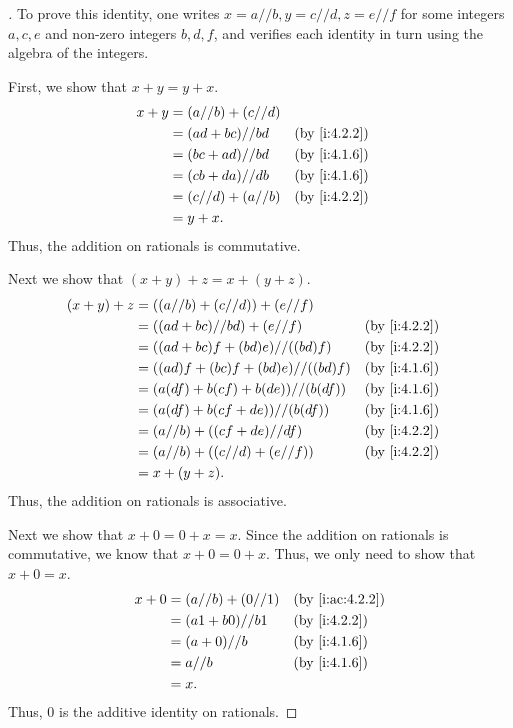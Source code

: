 \begin{proof}[]
  To prove this identity, one writes \(x = a // b, y = c // d, z = e // f\) for some integers \(a, c, e\) and non-zero integers \(b, d, f\), and verifies each identity in turn using the algebra of the integers.

  First, we show that \(x + y = y + x\).
  \begin{align*}
    x + y & = (a // b) + (c // d)                   \\
          & = (ad + bc) // bd     &  & \by{i:4.2.2} \\
          & = (bc + ad) // bd     &  & \by{i:4.1.6} \\
          & = (cb + da) // db     &  & \by{i:4.1.6} \\
          & = (c // d) + (a // b) &  & \by{i:4.2.2} \\
          & = y + x.
  \end{align*}
  Thus, the addition on rationals is commutative.

  Next we show that \((x + y) + z = x + (y + z)\).
  \begin{align*}
    (x + y) + z & = ((a // b) + (c // d)) + (e // f)                     \\
                & = ((ad + bc) // bd) + (e // f)       &  & \by{i:4.2.2} \\
                & = ((ad + bc)f + (bd)e) // ((bd)f)    &  & \by{i:4.2.2} \\
                & = ((ad)f + (bc)f + (bd)e) // ((bd)f) &  & \by{i:4.1.6} \\
                & = (a(df) + b(cf) + b(de)) // (b(df)) &  & \by{i:4.1.6} \\
                & = (a(df) + b(cf + de)) // (b(df))    &  & \by{i:4.1.6} \\
                & = (a // b) + ((cf + de) // df)       &  & \by{i:4.2.2} \\
                & = (a // b) + ((c // d) + (e // f))   &  & \by{i:4.2.2} \\
                & = x + (y + z).
  \end{align*}
  Thus, the addition on rationals is associative.

  Next we show that \(x + 0 = 0 + x = x\).
  Since the addition on rationals is commutative, we know that \(x + 0 = 0 + x\).
  Thus, we only need to show that \(x + 0 = x\).
  \begin{align*}
    x + 0 & = (a // b) + (0 // 1) &  & \by{i:ac:4.2.2} \\
          & = (a1 + b0) // b1     &  & \by{i:4.2.2}    \\
          & = (a + 0) // b        &  & \by{i:4.1.6}    \\
          & = a // b              &  & \by{i:4.1.6}    \\
          & = x.
  \end{align*}
  Thus, \(0\) is the additive identity on rationals.


\end{proof}
